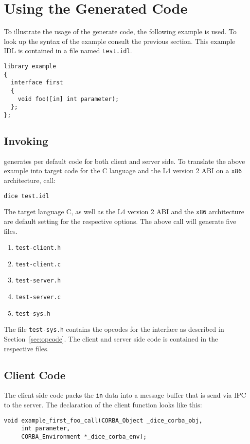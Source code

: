 \chapter{Using the Generated Code}
To illustrate the usage of the generate code, the following example
is used. To look up the syntax of the example consult the
previous section. This example IDL is contained in a
file named \verb|test.idl|.

\begin{verbatim}
library example
{
  interface first
  {
    void foo([in] int parameter);
  };
};
\end{verbatim}

\section{Invoking \dice{}}
\dice{} generates per default code for both client and
server side. To translate the above example into target
code for the C language and the L4 version 2 ABI on a
\verb|x86| architecture, call:

\begin{verbatim}
dice test.idl
\end{verbatim}

The target language C, as well as the L4 version 2 ABI and
the \verb|x86| architecture are default setting for the
respective options. The above call will generate five
files.

\begin{enumerate}
\item \verb|test-client.h|
\item \verb|test-client.c|
\item \verb|test-server.h|
\item \verb|test-server.c|
\item \verb|test-sys.h|
\end{enumerate}

The file \verb|test-sys.h| contains the opcodes for the
interface as described in Section~\ref{sec:opcode}. The 
client and server side code is contained in the respective
files.

\section{Client Code}
The client side code packs the \verb|in| data into a 
message buffer that is send via IPC to the server.
The declaration of the client function looks like this:

\begin{verbatim}
void example_first_foo_call(CORBA_Object _dice_corba_obj,
     int parameter,
     CORBA_Environment *_dice_corba_env);
\end{verbatim}
		
